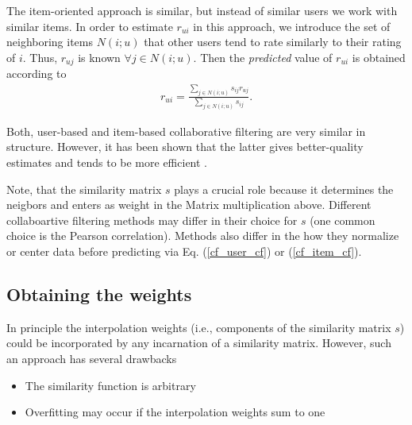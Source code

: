 \documentclass[10pt,a4paper]{article}
\begin{document}
The item-oriented approach is similar, but instead of similar users we work with similar items. In order to estimate $r_{ui}$ in this approach,  we introduce the set of neighboring items $N(i;u)$ that other users tend to rate similarly to their rating of $i$.   Thus, $r_{uj}$ is known $\forall j \in  N(i;u)$. Then the \textit{predicted} value of $r_{ui}$ is  obtained according to
\begin{align}
\label{cf_item_cf}
r_{ui} = \frac{\sum_{j \in N(i;u)} s_{ij} r_{uj}}{\sum_{j \in N(i;u)} s_{ij}}.
\end{align} 

Both, user-based and item-based collaborative filtering are very similar in structure. However, it has been shown that the latter gives better-quality estimates and tends to be more efficient \cite{sarwar_item_cf_2001}.

Note, that the similarity matrix $s$ plays a crucial role because it determines the neigbors and enters as weight in the Matrix multiplication above. Different collaboartive filtering methods may differ in their choice for $s$  (one common choice is the Pearson correlation). Methods also differ in the how they normalize or center data before predicting via Eq. (\ref{cf_user_cf}) or (\ref{cf_item_cf}).

\subsection{Obtaining the weights}
In principle the interpolation weights (i.e., components of the similarity matrix $s$) could be incorporated by any incarnation of a similarity matrix. However, such an approach has several drawbacks \cite{bell_yehuda_netflix_2007}
\begin{itemize} 
\item  The similarity function is arbitrary
\item  Overfitting may occur if the interpolation weights sum to one 
\end{itemize}
\end{document}
